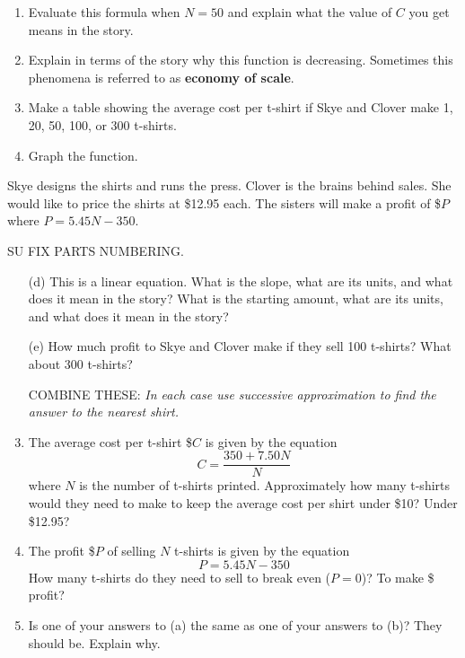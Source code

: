 \documentclass[12pt]{article}
\begin{document}
\begin{enumerate}
\begin{enumerate}
\item Evaluate this formula when $N=50$ and explain what the value of $C$ you get means in the story.
\item Explain in terms of the story why this function is decreasing.  Sometimes this phenomena is referred to as \textbf{economy of scale}.
\item Make a table showing the average cost per t-shirt if Skye and Clover make 1, 20, 50, 100, or 300 t-shirts.
\item Graph the function.
\end{enumerate}
Skye designs the shirts and runs the press.   Clover is the brains behind sales.  She would like to price the shirts at \$12.95 each.  The sisters will make a profit of \$$P$ where $P = 5.45N-350$.  

SU FIX PARTS NUMBERING.
\begin{enumerate}
\item [(d)]This is a linear equation.  What is the slope, what are its units, and what does it mean in the story?  What is the starting amount, what are its units, and what does it mean in the story?
\item [(e)] How much profit to Skye and Clover make if they sell 100 t-shirts?  What about 300 t-shirts?

COMBINE THESE:
  \emph{In each case use successive approximation to find the answer to the nearest shirt.}

\item The average cost per t-shirt \$$C$ is given by the equation $$C = \frac{350+7.50N}{N}$$ where $N$ is the number of t-shirts printed.  Approximately how many t-shirts would they need to make to keep the average cost per shirt under \$10?  Under \$12.95?
\item The profit  \$$P$ of selling $N$ t-shirts is given by the equation $$P = 5.45N-350$$  How many t-shirts do they need to sell to break even ($P=0$)? To make \$ profit?
\item Is one of your answers to (a) the same as one of your answers to (b)?  They should be.  Explain why.
\end{enumerate}



\end{enumerate}
\end{document}

